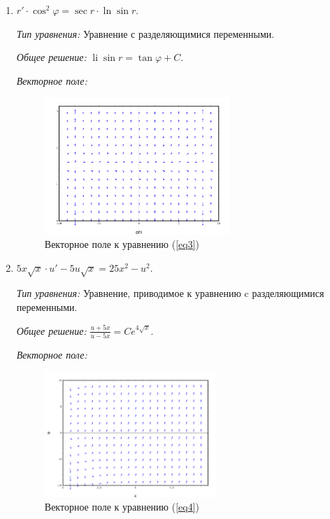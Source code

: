 \documentclass[14pt, a4paper, titlepage, fleqn]{extarticle}
\DeclareMathOperator{\li}{li}
\begin{document}
\begin{enumerate}
                \item 
                \( 
                    r' \cdot \cos^2{\varphi} = \sec{r} \cdot \ln{\sin{r}}.
                \)
                \label{eq3}

                \textit{Тип уравнения:}
                Уравнение с разделяющимися переменными.

                \textit{Общее решение:}
                \( \li{\sin{r}} = \tan{\varphi} + C. \)

                \textit{Векторное поле:}

                \begin{figure}[H]
                    \centering
                    \includegraphics[width=7cm]{pictures/vector_field_3.pdf}
                    \caption{Векторное поле к уравнению (\ref{eq3})}
                \end{figure}
                
                \item 
                \( 
                    5x\sqrt{x} \cdot u' -5u\sqrt{x} = 25x^2 - u^2.
                \)
                \label{eq4}

                \textit{Тип уравнения:}
                Уравнение, приводимое к уравнению c разделяющимися переменными.

                \textit{Общее решение:}
                \(
                    \displaystyle
                    \frac{u+5x}{u-5x} = C e^{4 \sqrt{x}}.
                \)

                \textit{Векторное поле:}

                \begin{figure}[H]
                    \centering
                    \includegraphics[width=6.5cm]{pictures/vector_field_4.pdf}
                    \caption{Векторное поле к уравнению (\ref{eq4})}
                \end{figure}
                

\end{enumerate}
\end{document}
